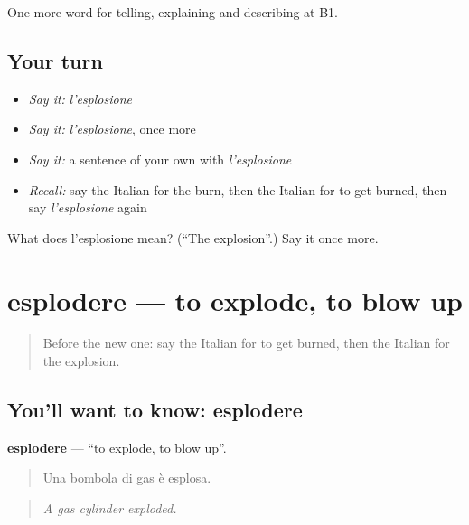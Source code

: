 \begin{grammarlens}[title={What you've built}]
One more word for telling, explaining and describing at B1.
\end{grammarlens}

\subsection*{Your turn}
\begin{itemize}
\raggedright
  \item \emph{Say it:} \emph{l'esplosione}
  \item \emph{Say it:} \emph{l'esplosione}, once more
  \item \emph{Say it:} a sentence of your own with \emph{l'esplosione}
  \item \emph{Recall:} say the Italian for the burn, then the Italian for to get burned, then say \emph{l'esplosione} again
\end{itemize}

\begin{tcolorbox}[breakable,colback=teal!4,colframe=teal!35!black,title={Before you move on}]
What does l'esplosione mean? (\textquotedblleft{}The explosion\textquotedblright{}.) Say it once more.
\end{tcolorbox}
\section[esplodere]{esplodere — to explode, to blow up}

\label{lesson:IT-C303-esplodere}



\begin{quote}
Before the new one: say the Italian for to get burned, then the Italian for the explosion.
\end{quote}

\subsection*{You'll want to know: esplodere}
\textbf{esplodere} — \textquotedblleft{}to explode, to blow up\textquotedblright{}.

\begin{quote}
Una bombola di gas è esplosa.
\end{quote}

\begin{quote}
\emph{A gas cylinder exploded.}
\end{quote}

